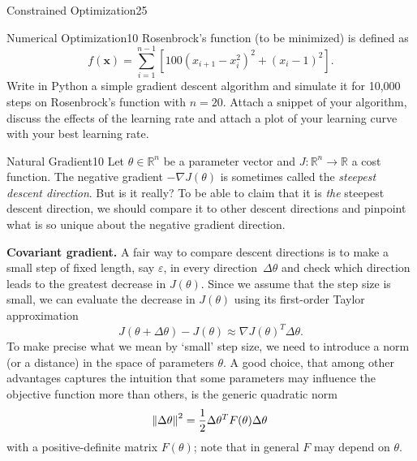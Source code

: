 \begin{questions}
\begin{question}{Constrained Optimization}{25}
\begin{answer}\end{answer}

\end{question}
	


\begin{question}{Numerical Optimization}{10}
Rosenbrock's function (to be minimized) is defined as 
$$f(\boldsymbol{x}) = \sum_{i=1}^{n-1} \left[ 100 (x_{i+1} - x_{i}^{2})^{2} + (x_{i} - 1)^{2}\right].$$
Write in Python a simple gradient descent algorithm and simulate it for 10,000 steps on Rosenbrock's function with $n=20$. Attach a snippet of your algorithm, discuss the effects of the learning rate and attach a plot of your learning curve with your best learning rate.

\begin{answer}\end{answer}

\end{question}


\begin{question}[bonus]{Natural Gradient}{10}
Let $\theta \in \mathbb{R}^n$ be a parameter vector
and $J \colon \mathbb{R}^n \to \mathbb{R}$ a cost function.
The negative gradient $-\nabla J(\theta)$ is sometimes called
the \emph{steepest descent direction}. But is it really?
To be able to claim that it is \emph{the} steepest descent direction,
we should compare it to other descent directions
and pinpoint what is so unique about the negative gradient direction.

\textbf{Covariant gradient.}
A fair way to compare descent directions is to make
a small step of fixed length, say $\varepsilon$,
in every direction~$\Delta \theta$ and check
which direction leads to the greatest decrease in $J(\theta)$.
Since we assume that the step size is small, we can evaluate
the decrease in $J(\theta)$ using its first-order Taylor approximation
\begin{equation*}
  J(\theta + \Delta \theta) - J(\theta) \approx
  \nabla J(\theta)^T \Delta \theta.
\end{equation*}
To make precise what we mean by `small' step size,
we need to introduce a norm (or a distance)
in the space of parameters $\theta$.
A good choice, that among other advantages captures the intuition
that some parameters may influence the objective function more
than others,
is the generic quadratic norm
\begin{equation*}
  \norm{\Delta \theta}^2 =
  \frac{1}{2}\Delta \theta^T F(\theta) \Delta \theta
\end{equation*}
with a positive-definite matrix $F(\theta)$;
note that in general $F$ may depend on $\theta$.


\end{question}
\end{questions}
